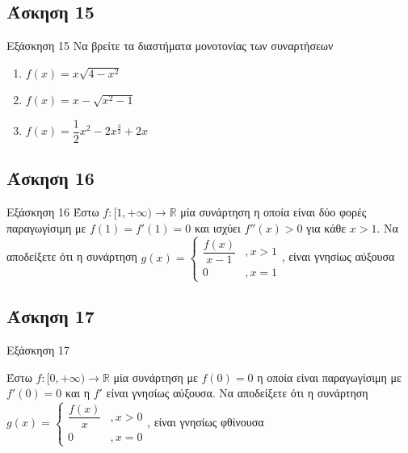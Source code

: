 \documentclass[greek]{beamer}
\begin{document}
\subsection{Άσκηση 15}
\begin{frame}[label=Άσκηση15]{Εξάσκηση 15}
  Να βρείτε τα διαστήματα μονοτονίας των συναρτήσεων
  \begin{enumerate}
    \item<1-> $f(x)=x\sqrt{4-x^2}$
    \item<2-> $f(x)=x-\sqrt{x^2-1}$
    \item<3-> $f(x)=\dfrac{1}{2}x^2-2x^{\frac{3}{2}}+2x$
  \end{enumerate}

\end{frame}

\subsection{Άσκηση 16}
\begin{frame}[label=Άσκηση16]{Εξάσκηση 16}
  Έστω $f:[1,+\infty)\to\mathbb{R}$ μία συνάρτηση η οποία είναι δύο φορές παραγωγίσιμη με $f(1)=f'(1)=0$ και ισχύει $f''(x)>0$ για κάθε $x>1$. Να αποδείξετε ότι η συνάρτηση $g(x)=\begin{cases}
      \dfrac{f(x)}{x-1} & ,x>1 \\
      0                 & ,x=1
    \end{cases}$, είναι γνησίως αύξουσα

\end{frame}

\subsection{Άσκηση 17}
\begin{frame}[label=Άσκηση17]{Εξάσκηση 17}

  Έστω $f:[0,+\infty)\to\mathbb{R}$ μία συνάρτηση με $f(0)=0$ η οποία είναι παραγωγίσιμη με $f'(0)=0$ και η $f'$ είναι γνησίως αύξουσα. Να αποδείξετε ότι η συνάρτηση $g(x)=\begin{cases}
      \dfrac{f(x)}{x} & ,x>0 \\
      0               & ,x=0
    \end{cases}$, είναι γνησίως φθίνουσα

\end{frame}
\end{document}
